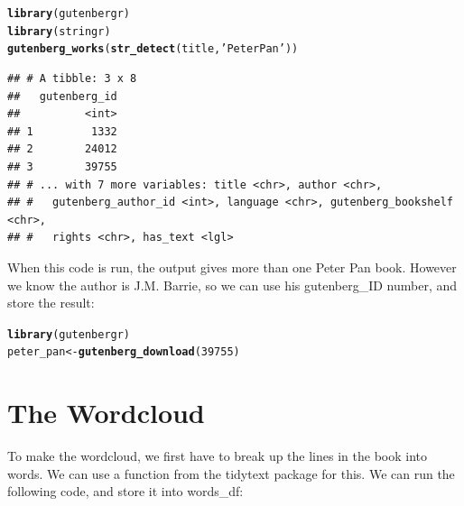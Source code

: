 \documentclass{article}\usepackage[]{graphicx}\usepackage[]{color}
\makeatletter
\newcommand{\hlnum}[1]{\textcolor[rgb]{0.686,0.059,0.569}{#1}}%
\newcommand{\hlstr}[1]{\textcolor[rgb]{0.192,0.494,0.8}{#1}}%
\newcommand{\hlstd}[1]{\textcolor[rgb]{0.345,0.345,0.345}{#1}}%
\newcommand{\hlkwb}[1]{\textcolor[rgb]{0.69,0.353,0.396}{#1}}%
\newcommand{\hlkwd}[1]{\textcolor[rgb]{0.737,0.353,0.396}{\textbf{#1}}}%
\newenvironment{kframe}{%
 \def\at@end@of@kframe{}%
 \ifinner\ifhmode%
  \def\at@end@of@kframe{\end{minipage}}%
  \begin{minipage}{\columnwidth}%
 \fi\fi%
 \def\FrameCommand##1{\hskip\@totalleftmargin \hskip-\fboxsep
 \colorbox{shadecolor}{##1}\hskip-\fboxsep
     \hskip-\linewidth \hskip-\@totalleftmargin \hskip\columnwidth}%
 \MakeFramed {\advance\hsize-\width
   \@totalleftmargin\z@ \linewidth\hsize
   \@setminipage}}%
 {\par\unskip\endMakeFramed%
 \at@end@of@kframe}
\newenvironment{knitrout}{}{} %
\makeatother
\begin{document}
\begin{knitrout}
\color{fgcolor}\begin{kframe}
\begin{alltt}
\hlkwd{library}\hlstd{(gutenbergr)}
\hlkwd{library}\hlstd{(stringr)}
\hlkwd{gutenberg_works}\hlstd{(}\hlkwd{str_detect}\hlstd{(title,}\hlstr{'Peter Pan'}\hlstd{))}
\end{alltt}
\begin{verbatim}
## # A tibble: 3 x 8
##   gutenberg_id
##          <int>
## 1         1332
## 2        24012
## 3        39755
## # ... with 7 more variables: title <chr>, author <chr>,
## #   gutenberg_author_id <int>, language <chr>, gutenberg_bookshelf <chr>,
## #   rights <chr>, has_text <lgl>
\end{verbatim}
\end{kframe}
\end{knitrout}

When this code is run, the output gives more than one Peter Pan book. However we know the author is J.M. Barrie, so we can use his gutenberg\_ID number, and store the result:

\begin{knitrout}
\color{fgcolor}\begin{kframe}
\begin{alltt}
\hlkwd{library}\hlstd{(gutenbergr)}
\hlstd{peter_pan}\hlkwb{<-}\hlkwd{gutenberg_download}\hlstd{(}\hlnum{39755}\hlstd{)}
\end{alltt}


{\ttfamily\noindent\itshape\color{messagecolor}{\#\# Determining mirror for Project Gutenberg from http://www.gutenberg.org/robot/harvest}}

{\ttfamily\noindent\itshape\color{messagecolor}{\#\# Using mirror http://aleph.gutenberg.org}}\end{kframe}
\end{knitrout}

\section{The Wordcloud}
To make the wordcloud, we first have to break up the lines in the book into words. We can use a function from the tidytext package for this. We can run the following code, and store it into words\_df:
\end{document}
